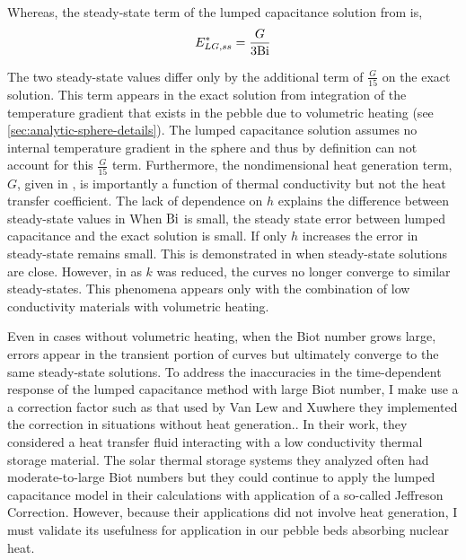 Whereas, the steady-state term of the lumped capacitance solution from  is,
\begin{equation}
	E^*_{LG,ss} = \frac{G}{3\mathrm{Bi}}
\end{equation}

The two steady-state values differ only by the additional term of $\frac{G}{15}$ on the exact solution. This term appears in the exact solution from integration of the temperature gradient that exists in the pebble due to volumetric heating (see \cref{sec:analytic-sphere-details}). The lumped capacitance solution assumes no internal temperature gradient in the sphere and thus by definition can not account for this $\frac{G}{15}$ term. Furthermore, the nondimensional heat generation term, $G$, given in , is importantly a function of thermal conductivity but not the heat transfer coefficient. The lack of dependence on $h$ explains the difference between steady-state values in   When $\mathrm{Bi}$ is small, the steady state error between lumped capacitance and the exact solution is small. If only $h$ increases the error in steady-state remains small. This is demonstrated in  when steady-state solutions are close. However, in  as $k$ was reduced, the curves no longer converge to similar steady-states. This phenomena appears only with the combination of low conductivity materials with volumetric heating.

Even in cases without volumetric heating, when the Biot number grows large, errors appear in the transient portion of curves but ultimately converge to the same steady-state solutions. To address the inaccuracies in the time-dependent response of the lumped capacitance method with large Biot number, I make use a a correction factor such as that used by Van Lew and Xu\etal where they implemented the correction in situations without heat generation.\cite{VanLew2010,Xu2012}. In their work, they considered a heat transfer fluid interacting with a low conductivity thermal storage material. The solar thermal storage systems they analyzed often had moderate-to-large Biot numbers but they could continue to apply the lumped capacitance model in their calculations with application of a so-called Jeffreson Correction.\cite{jeffreson409} However, because their applications did not involve heat generation, I must validate its usefulness for application in our pebble beds absorbing nuclear heat.





